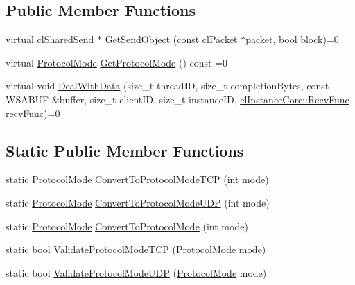 \subsection*{Public Member Functions}
\begin{DoxyCompactItemize}
\item 
virtual \hyperlink{classcl_shared_send}{clSharedSend} $\ast$ \hyperlink{classcl_shared_protocol_ae8ba1c07871850b15abc9d15ec475d8e}{GetSendObject} (const \hyperlink{classcl_packet}{clPacket} $\ast$packet, bool block)=0
\item 
virtual \hyperlink{classcl_shared_protocol_a4b0b9c82b8ae4eee78c6308c35afd47b}{ProtocolMode} \hyperlink{classcl_shared_protocol_a473332c76ea2409937925e2390ac96a1}{GetProtocolMode} () const =0
\item 
virtual void \hyperlink{classcl_shared_protocol_a2b6f3bd561af01c5ef02b06ebe24c5a0}{DealWithData} (size\_\-t threadID, size\_\-t completionBytes, const WSABUF \&buffer, size\_\-t clientID, size\_\-t instanceID, \hyperlink{classcl_instance_core_afa96c2a2c0b26b6a9256b87798bf9587}{clInstanceCore::RecvFunc} recvFunc)=0
\end{DoxyCompactItemize}
\subsection*{Static Public Member Functions}
\begin{DoxyCompactItemize}
\item 
static \hyperlink{classcl_shared_protocol_a4b0b9c82b8ae4eee78c6308c35afd47b}{ProtocolMode} \hyperlink{classcl_shared_protocol_aac70aa1c3585a28ad5a4b502a0ba1153}{ConvertToProtocolModeTCP} (int mode)
\item 
static \hyperlink{classcl_shared_protocol_a4b0b9c82b8ae4eee78c6308c35afd47b}{ProtocolMode} \hyperlink{classcl_shared_protocol_a59665ab24750d32171d8cb7ccac25898}{ConvertToProtocolModeUDP} (int mode)
\item 
static \hyperlink{classcl_shared_protocol_a4b0b9c82b8ae4eee78c6308c35afd47b}{ProtocolMode} \hyperlink{classcl_shared_protocol_acabf37df7540794029e577e1c32f6e95}{ConvertToProtocolMode} (int mode)
\item 
static bool \hyperlink{classcl_shared_protocol_a0a087713788c58088aaac8331d70c74e}{ValidateProtocolModeTCP} (\hyperlink{classcl_shared_protocol_a4b0b9c82b8ae4eee78c6308c35afd47b}{ProtocolMode} mode)
\item 
static bool \hyperlink{classcl_shared_protocol_a42d981813f39d61c52842c7ac361cb5d}{ValidateProtocolModeUDP} (\hyperlink{classcl_shared_protocol_a4b0b9c82b8ae4eee78c6308c35afd47b}{ProtocolMode} mode)
\end{DoxyCompactItemize}


